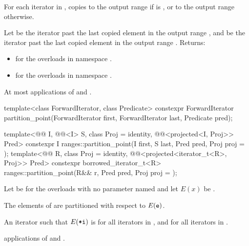 \begin{itemdescr}
\pnum
\effects
For each iterator  in ,
copies  to the output range 
if  is , or
to the output range  otherwise.

\pnum
\returns
Let  be the iterator past the last copied element
in the output range ,
and  be the iterator past the last copied element
in the output range .
Returns:
\begin{itemize}
\item {} for the overloads in namespace .
\item {} for the overloads in namespace .
\end{itemize}

\pnum
\complexity
At most  applications of  and .
\end{itemdescr}

%
\begin{itemdecl}
template<class ForwardIterator, class Predicate>
  constexpr ForwardIterator
    partition_point(ForwardIterator first, ForwardIterator last, Predicate pred);

template<@@ I, @@<I> S, class Proj = identity,
         @@<projected<I, Proj>> Pred>
  constexpr I ranges::partition_point(I first, S last, Pred pred, Proj proj = {});
template<@@ R, class Proj = identity,
         @@<projected<iterator_t<R>, Proj>> Pred>
  constexpr borrowed_iterator_t<R>
    ranges::partition_point(R&& r, Pred pred, Proj proj = {});
\end{itemdecl}

\begin{itemdescr}
\pnum
Let  be 
for the overloads with no parameter named 
and let $E(x)$ be .

\pnum
\expects
The elements  of 
are partitioned with respect to $E(\tcode{e})$.

\pnum
\returns
An iterator 
such that $E(\tcode{*i})$ is 
for all iterators  in , and
 for all iterators  in .

\pnum
\complexity
{} applications
of  and .
\end{itemdescr}

